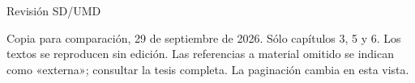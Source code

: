 \documentclass[spanish,a4paper,12pt]{article}
\begin{document}
\begin{center}\Large Revisión SD/UMD\end{center}
\noindent Copia para comparación, 29 de septiembre de 2026. Sólo capítulos 3, 5 y 6.
Los textos se reproducen sin edición. Las referencias a material omitido se indican
como «externa»; consultar la tesis completa. La paginación cambia en esta vista.
\tableofcontents

\clearpage
\setcounter{section}{2}
\label{review:03}


\clearpage
\setcounter{section}{4}
\label{review:05}


\clearpage
\setcounter{section}{5}
\label{review:06}


\clearpage
\printbibliography
\end{document}
